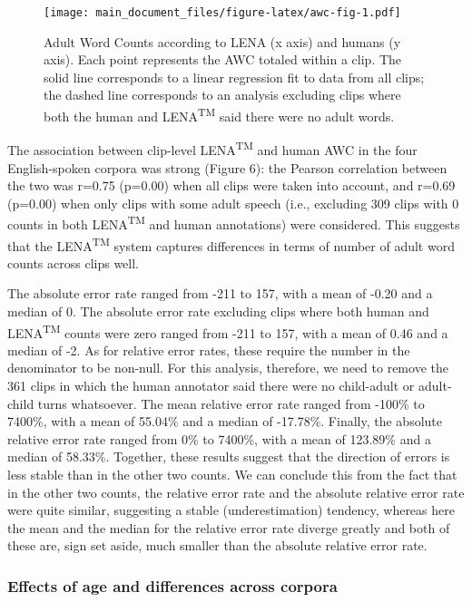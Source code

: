\documentclass[english,floatsintext,man]{apa6}
\begin{document}
\begin{figure}
\centering
\texttt{[image: main\_document\_files/figure-latex/awc-fig-1.pdf]}
\caption{\label{fig:awc-fig}Adult Word Counts according to LENA (x axis) and
humans (y axis). Each point represents the AWC totaled within a clip.
The solid line corresponds to a linear regression fit to data from all
clips; the dashed line corresponds to an analysis excluding clips where
both the human and LENA\textsuperscript{TM} said there were no adult
words.}
\end{figure}

The association between clip-level LENA\textsuperscript{TM} and human
AWC in the four English-spoken corpora was strong (Figure 6): the
Pearson correlation between the two was r=0.75 (p=0.00) when all clips
were taken into account, and r=0.69 (p=0.00) when only clips with some
adult speech (i.e., excluding 309 clips with 0 counts in both
LENA\textsuperscript{TM} and human annotations) were considered. This
suggests that the LENA\textsuperscript{TM} system captures differences
in terms of number of adult word counts across clips well.

The absolute error rate ranged from -211 to 157, with a mean of -0.20
and a median of 0. The absolute error rate excluding clips where both
human and LENA\textsuperscript{TM} counts were zero ranged from -211 to
157, with a mean of 0.46 and a median of -2. As for relative error
rates, these require the number in the denominator to be non-null. For
this analysis, therefore, we need to remove the 361 clips in which the
human annotator said there were no child-adult or adult-child turns
whatsoever. The mean relative error rate ranged from -100\% to 7400\%,
with a mean of 55.04\% and a median of -17.78\%. Finally, the absolute
relative error rate ranged from 0\% to 7400\%, with a mean of 123.89\%
and a median of 58.33\%. Together, these results suggest that the
direction of errors is less stable than in the other two counts. We can
conclude this from the fact that in the other two counts, the relative
error rate and the absolute relative error rate were quite similar,
suggesting a stable (underestimation) tendency, whereas here the mean
and the median for the relative error rate diverge greatly and both of
these are, sign set aside, much smaller than the absolute relative error
rate.

\subsubsection{Effects of age and differences across
corpora}\label{effects-of-age-and-differences-across-corpora}
\end{document}
